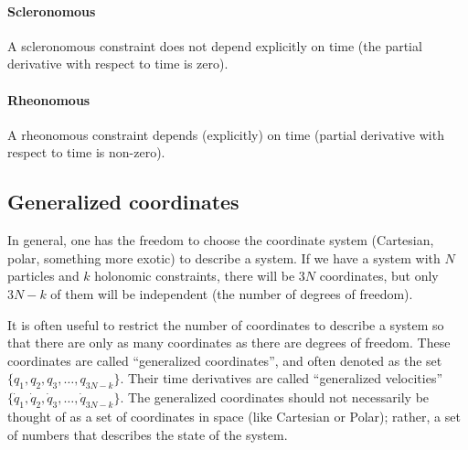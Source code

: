 \paragraph{Scleronomous}
A scleronomous constraint does not depend explicitly on time (the partial derivative with respect to time is zero).
\paragraph{Rheonomous}
A rheonomous constraint depends (explicitly) on time (partial derivative with respect to time is non-zero).

\subsection{Generalized coordinates}
In general, one has the freedom to choose the coordinate system (Cartesian, polar, something more exotic) to describe a system. If we have a system with $N$ particles and $k$ holonomic constraints, there will be $3N$ coordinates, but only $3N-k$ of them will be independent (the number of degrees of freedom). 

It is often useful to restrict the number of coordinates to describe a system so that there are only as many coordinates as there are degrees of freedom. These coordinates are called ``generalized coordinates'', and often denoted as the set  $\{q_1,q_2,q_3,\dots,q_{3N-k}\}$. Their time derivatives are called ``generalized velocities'' $\{\dot{q}_1,\dot{q}_2,\dot{q}_3,\dots,\dot{q}_{3N-k}\}$. The generalized coordinates should not necessarily be thought of as a set of coordinates in space (like Cartesian or Polar); rather, a set of numbers that describes the state of the system. 

